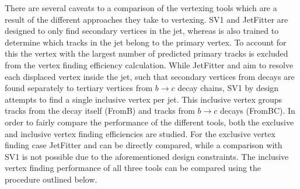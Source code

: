 


There are several caveats to a comparison of the vertexing tools which are a result of the different approaches they take to vertexing.
SV1 and JetFitter are designed to only find secondary vertices in the jet, whereas \GNN is also trained to determine which tracks in the jet belong to the primary vertex.
To account for this the \GNN vertex with the largest number of predicted primary tracks is excluded from the vertex finding efficiency calculation.
While JetFitter and \GNN aim to resolve each displaced vertex inside the jet, such that secondary vertices from \bhadron decays are found separately to tertiary vertices from $b \rightarrow c$ decay chains, SV1 by design attempts to find a single inclusive vertex per jet.
This inclusive vertex groups tracks from the \bhadron decay itself (FromB) and tracks from $b \rightarrow c$ decays (FromBC).
In order to fairly compare the performance of the different tools, both the exclusive and inclusive vertex finding efficiencies are studied.
For the exclusive vertex finding case JetFitter and \GNN can be directly compared, while a comparison with SV1 is not possible due to the aforementioned design constraints.
The inclusive vertex finding performance of all three tools can be compared using the procedure outlined below.


